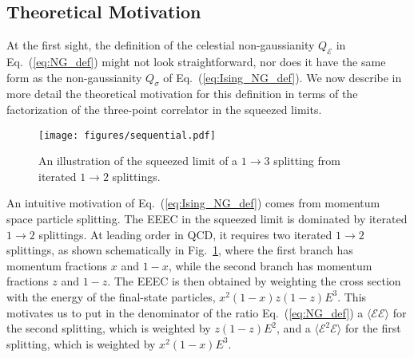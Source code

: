 \documentclass[letterpaper,11pt]{article}
\def\Fig#1{Fig.~{\ref{#1}}}
\def\to{\rightarrow}
\DeclareRobustCommand{\Fig}[1]{Fig.~\ref{#1}}
\DeclareRobustCommand{\Eq}[1]{Eq.~(\ref{#1})}
\begin{document}
\subsection{Theoretical Motivation} \label{sec:NG_motivation}


At the first sight, the definition of the celestial non-gaussianity $Q_{\mathcal{E}}$ in \Eq{eq:NG_def} might not look straightforward, nor does it have the same form as the non-gaussianity $Q_\sigma$ of \Eq{eq:Ising_NG_def}.
%
We now describe in more detail the theoretical motivation for this definition in terms of the factorization of the three-point correlator in the squeezed limits.
%


\begin{figure}[t]
\begin{center}
\texttt{[image: figures/sequential.pdf]}
\caption{An illustration of the squeezed limit of a $1 \to 3$ splitting from iterated $1 \to 2$ splittings. }
\label{fig:sequential}
\end{center}
\end{figure}


An intuitive motivation of \Eq{eq:Ising_NG_def} comes from momentum space particle splitting.
%
The EEEC in the squeezed limit is dominated by iterated $1 \to 2$ splittings.
%
At leading order in QCD, it requires two iterated $1 \to 2$ splittings, as shown schematically in \Fig{fig:sequential}, where the first branch has momentum fractions $x$ and $1-x$, while the second branch has momentum fractions $z$ and $1-z$.
%
The EEEC is then obtained by weighting the cross section with the energy of the final-state particles, $x^2 (1- x) z (1-z) E^3$.
%
This motivates us to put in the denominator of the ratio \Eq{eq:NG_def} a $\langle \mathcal{E} \mathcal{E} \rangle$ for the second splitting, which is weighted by $z (1 - z) E^2$, and a $\langle \mathcal{E}^2 \mathcal{E} \rangle$ for the first splitting, which is weighted by $x^2 (1-x) E^3$.
\end{document}

